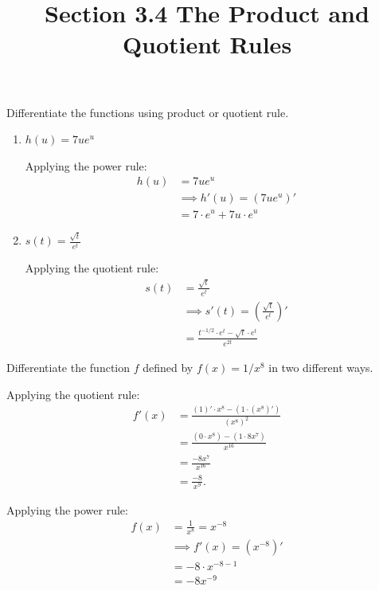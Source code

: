 \documentclass[nooutcomes]{ximera}
\title{Section 3.4 The Product and Quotient Rules}
\begin{document}
\begin{abstract}		\end{abstract}
\maketitle


\begin{problem} Differentiate the functions using product or quotient rule.
\begin{enumerate}
	\item $h(u)=7ue^u$
	\begin{freeResponse}
 Applying the power rule:
  \begin{align*}
    h(u) &=7ue^u\\
    &\implies h'(u) = (7ue^u) '\\
    &= 7\cdot e^u+7u \cdot e^u
  \end{align*}
  \end{freeResponse}
	
	\item $s(t)=\frac{\sqrt{t}}{e^t}$
	\begin{freeResponse}
 Applying the quotient rule:
  \begin{align*}
    s(t)&=\frac{\sqrt{t}}{e^t}\\
    &\implies s'(t) = \left(\frac{\sqrt{t}}{e^t}\right)' \\
    &= \frac{t^{-1/2} \cdot e^t -  \sqrt{t}\cdot e^t}{e^{2t}}
  \end{align*}
  \end{freeResponse}
\end{enumerate}
\end{problem}

\begin{problem}
 Differentiate the function $f$ defined by $f(x) = 1/x^8$ in two different ways.
  \begin{freeResponse}
    Applying the quotient rule:
    \begin{align*}
      f'(x) &= \frac{(1)' \cdot x^8 - (1 \cdot (x^8)')}{(x^8)^2} \\
            &= \frac{(0 \cdot x^8) - (1 \cdot 8x^7)}{x^{16}} \\
            &= \frac{-8x^7}{x^{16}}\\
            &= \frac{-8}{x^9}. 
    \end{align*}

  Applying the power rule:
  \begin{align*}
    f(x) &= \frac{1}{x^8} = x^{-8}\\
    &\implies f'(x) = (x^{-8})'\\
    &= -8\cdot x^{-8 -1}\\
    &= -8x^{-9}
  \end{align*}
  \end{freeResponse}
\end{problem}
	
\end{document}
